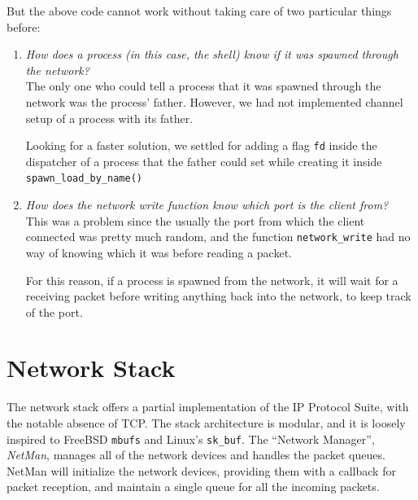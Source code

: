 \documentclass[a4paper,twoside,openright]{report}
\renewcommand{\t}[1]{%
	{\texttt{#1}}}
\begin{document}
But the above code cannot work without taking care of two particular things before:
\begin{enumerate}
	\item \emph{How does a process (in this case, the shell) know if it was spawned through
		the network?}\\
		The only one who could tell a process that it was spawned through the network 
		was the process' father. However, we had not implemented channel setup of 
		a process with its father.

		Looking for a faster solution, we settled for adding a flag \t{fd}
		inside the dispatcher of a process that the father could set while
		creating it inside \t{spawn\_load\_by\_name()}

	\item \emph{How does the network write function know which port is the client from?}\\
		This was a problem since the usually the port from which the client connected
		was pretty much random, and the function \t{network\_write} had no way of knowing 
		which it was before reading a packet.

		For this reason, if a process is spawned from the network, it will wait for a receiving
		packet before writing anything back into the network, to keep track of the port.
\end{enumerate}

\chapter{Network Stack} \label{cap:nm}
The network stack offers a partial implementation of the IP Protocol Suite, with the notable absence of TCP.
The stack architecture is modular, and it is loosely inspired to FreeBSD \texttt{mbufs} and Linux's \texttt{sk\_buf}.
The ``Network Manager'', \emph{NetMan}, manages all of the network devices and handles the packet queues. NetMan will initialize the network devices, providing them with a callback for packet reception, and maintain a single queue for all the incoming packets.
\end{document}

